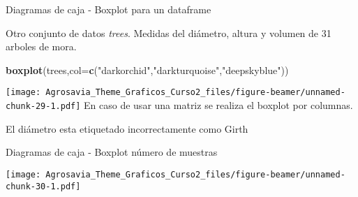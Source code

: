 \documentclass[ignorenonframetext,]{beamer}
\newenvironment{Shaded}{\begin{snugshade}}{\end{snugshade}}
\newcommand{\KeywordTok}[1]{\textcolor[rgb]{0.13,0.29,0.53}{\textbf{#1}}}
\newcommand{\DataTypeTok}[1]{\textcolor[rgb]{0.13,0.29,0.53}{#1}}
\newcommand{\DecValTok}[1]{\textcolor[rgb]{0.00,0.00,0.81}{#1}}
\newcommand{\FloatTok}[1]{\textcolor[rgb]{0.00,0.00,0.81}{#1}}
\newcommand{\StringTok}[1]{\textcolor[rgb]{0.31,0.60,0.02}{#1}}
\newcommand{\OperatorTok}[1]{\textcolor[rgb]{0.81,0.36,0.00}{\textbf{#1}}}
\newcommand{\NormalTok}[1]{#1}
\begin{document}
\begin{frame}[fragile]{Diagramas de caja - Boxplot para un dataframe}

Otro conjunto de datos \textit{trees}. Medidas del diámetro, altura y
volumen de 31 arboles de mora.

\begin{Shaded}
\begin{Highlighting}[]
\KeywordTok{boxplot}\NormalTok{(trees,}\DataTypeTok{col=}\KeywordTok{c}\NormalTok{(}\StringTok{"darkorchid"}\NormalTok{,}\StringTok{"darkturquoise"}\NormalTok{,}\StringTok{"deepskyblue"}\NormalTok{))}
\end{Highlighting}
\end{Shaded}

\texttt{[image: Agrosavia\_Theme\_Graficos\_Curso2\_files/figure-beamer/unnamed-chunk-29-1.pdf]}
En caso de usar una matriz se realiza el boxplot por columnas.

\tiny{El diámetro esta etiquetado incorrectamente como Girth}

\end{frame}

\begin{frame}[fragile]{Diagramas de caja - Boxplot número de muestras}

\begin{Shaded}
\end{Shaded}

\texttt{[image: Agrosavia\_Theme\_Graficos\_Curso2\_files/figure-beamer/unnamed-chunk-30-1.pdf]}

\end{frame}
\end{document}
